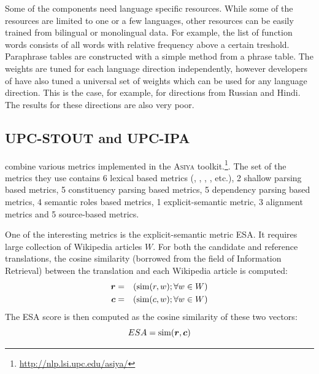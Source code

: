 Some of the  components need language specific resources.
While some of the resources are limited to one or a few languages, other
resources can be easily trained from bilingual or monolingual data. For
example, the list of function words consists of all words with relative
frequency above a certain treshold. Paraphrase tables are constructed with a
simple method from a phrase table. The weights are tuned for each language
direction independently, however developers of  have also tuned
a universal set of weights which can be used for any language direction. This
is the case, for example, for directions from Russian and Hindi. The results
for these directions are also very poor.

\subsection{UPC-STOUT and UPC-IPA}

 combine various metrics implemented in the
\textsc{Asiya} toolkit.\footnote{\url{http://nlp.lsi.upc.edu/asiya/}}. The set
of the metrics they use contains 6 lexical based metrics (,
, , , etc.), 2 shallow parsing
based metrics, 5 constituency parsing based metrics, 5 dependency parsing based
metrics, 4 semantic roles based metrics, 1 explicit-semantic metric, 3
alignment metrics and 5 source-based metrics.

One of the interesting metrics is the explicit-semantic metric ESA. It requires
large collection of Wikipedia articles $W$. For both the candidate and
reference translations, the cosine similarity (borrowed from the field of
Information Retrieval) between the translation and each Wikipedia article is
computed:
\begin{eqnarray*}
  \boldsymbol{r} & = & \left(\operatorname{sim}(r,w); \forall w \in W  \right)\\
  \boldsymbol{c} & = & \left(\operatorname{sim}(c,w); \forall w \in W  \right)\\
\end{eqnarray*}
The ESA score is then computed as the cosine similarity of these
two vectors:
\begin{equation*}
  ESA = \operatorname{sim}(\boldsymbol{r}, \boldsymbol{c})
\end{equation*}


